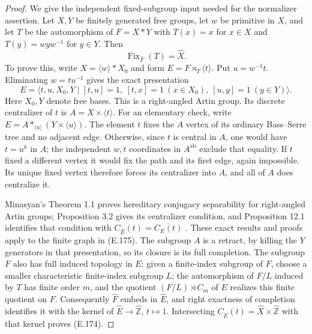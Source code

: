 \begin{proof}
We give the independent fixed-subgroup input needed for the
normalizer assertion.  Let $X,Y$ be finitely generated free
groups, let $w$ be primitive in $X$, and let $T$ be the
automorphism of $F=X*Y$ with
$T(x)=x$ for $x\in X$ and $T(y)=wyw^{-1}$ for $y\in Y$.
Then
\[
                 \operatorname{Fix}_{\widehat F}(T)
                         =\widehat X.                         \tag{E.174}
\]
To prove this, write $X=\langle w\rangle*X_0$ and form
$E=F\rtimes_T\langle t\rangle$.  Put $u=w^{-1}t$.
Eliminating $w=t u^{-1}$ gives the exact presentation
\[
 E=\langle t,u,X_0,Y\mid [t,u]=1,\ [t,x]=1\ (x\in X_0),
                                  \ [u,y]=1\ (y\in Y)\rangle.
                                                               \tag{E.175}
\]
Here $X_0,Y$ denote free bases.  This is a right-angled Artin
group.  Its discrete centralizer of $t$ is
$A=X\times\langle t\rangle$.  For an elementary check, write
$E=A*_{\langle u\rangle}(Y\times\langle u\rangle)$.
The element $t$ fixes the $A$ vertex of its ordinary
Bass--Serre tree and no adjacent edge.  Otherwise, since $t$
is central in $A$, one would have $t=u^k$ in $A$; the
independent $w,t$ coordinates in $A^{\mathrm{ab}}$ exclude
that equality.  If $t$ fixed a different vertex it would fix
the path and its first edge, again impossible.  Its unique
fixed vertex therefore forces its centralizer into $A$, and
all of $A$ does centralize it.

Minasyan's Theorem 1.1 proves hereditary conjugacy separability
for right-angled Artin groups; Proposition 3.2 gives its
centralizer condition, and Proposition 12.1 identifies that
condition with
$C_{\widehat E}(t)=\overline{C_E(t)}$
\cite[Theorem 1.1; Proposition 3.2; Proposition 12.1,
pp.~383--384]{ET_Minasyan2012}.
These exact results and proofs apply to the finite graph in
(E.175).  The subgroup $A$ is a retract, by killing the $Y$
generators in that presentation, so its closure is its full
completion.  The subgroup $F$ also has full induced topology
in $E$: given a finite-index subgroup of $F$, choose a smaller
characteristic finite-index subgroup $L$; the automorphism of
$F/L$ induced by $T$ has finite order $m$, and the quotient
$(F/L)\rtimes C_m$ of $E$ realizes this finite quotient on $F$.
Consequently $\widehat F$ embeds in $\widehat E$, and right
exactness of completion identifies it with the kernel of
$\widehat E\to\widehat{\mathbb Z}$, $t\mapsto1$.  Intersecting
$C_{\widehat E}(t)=\widehat X\times\widehat{\mathbb Z}$ with
that kernel proves (E.174).


\end{proof}
